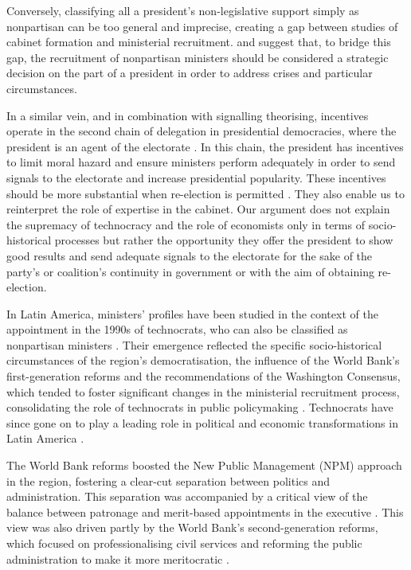 \documentclass[12pt,halfline,a4paper]{ouparticle}
\begin{document}
Conversely, classifying all a president’s non-legislative support simply as nonpartisan can be too general and imprecise, creating a gap between studies of cabinet formation and ministerial recruitment. \cite{MartinezGallardo2015} and \cite{Camerlo2018} suggest that, to bridge this gap, the recruitment of nonpartisan ministers should be considered a strategic decision on the part of a president in order to address crises and particular circumstances.

In a similar vein, and in combination with signalling theorising, incentives operate in the second chain of delegation in presidential democracies, where the president is an agent of the electorate \citep{Elgie2020}. In this chain, the president has incentives to limit moral hazard and ensure ministers perform adequately in order to send signals to the electorate and increase presidential popularity. These incentives should be more substantial when re-election is permitted \citep[][see also \citeauthor{Beckman2020}, \citeyear{Beckman2020}]{Camerlo2015a}. They also enable us to reinterpret the role of expertise in the cabinet. Our argument does not explain the supremacy of technocracy and the role of economists only in terms of socio-historical processes but rather the opportunity they offer the president to show good results and send adequate signals to the electorate for the sake of the party’s or coalition’s continuity in government or with the aim of obtaining re-election. 

In Latin America, ministers’ profiles have been studied in the context of the appointment in the 1990s of technocrats, who can also be classified as nonpartisan ministers \citep[][see also \citeauthor{Camerlo2018}, \citeyear{Camerlo2018}; \citeauthor{Joignant2011}, \citeyear{Joignant2011}]{Centeno1998, Silva2009}. Their emergence reflected the specific socio-historical circumstances of the region’s democratisation, the influence of the World Bank’s first-generation reforms and the recommendations of the Washington Consensus, which tended to foster significant changes in the ministerial recruitment process, consolidating the role of technocrats in public policymaking \citep{Camerlo2018, Centeno1998}. Technocrats have since gone on to play a leading role in political and economic transformations in Latin America \citep{Centeno1998, Silva2009}. 

The World Bank reforms boosted the New Public Management (NPM) approach in the region, fostering a clear-cut separation between politics and administration. This separation was accompanied by a critical view of the balance between patronage and merit-based appointments in the executive \citep{GonzalezBustamante2020}. This view was also driven partly by the World Bank’s second-generation reforms, which focused on professionalising civil services and reforming the public administration to make it more meritocratic \citep{Panizza2005}.
\end{document}
